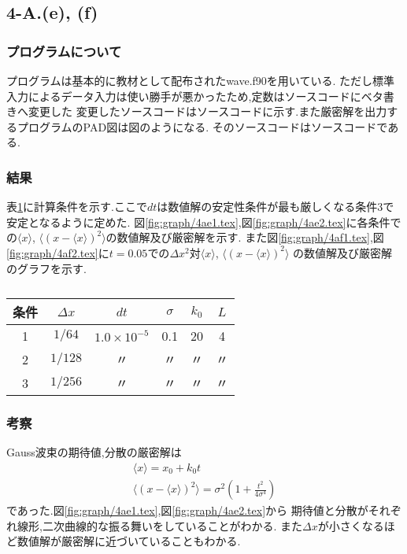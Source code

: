 \subsection*{4-A.(e), (f)}
\subsubsection*{プログラムについて}
プログラムは基本的に教材として配布されたwave.f90を用いている.
ただし標準入力によるデータ入力は使い勝手が悪かったため,定数はソースコードにベタ書きへ変更した
変更したソースコードはソースコードに示す.また厳密解を出力するプログラムのPAD図は図のようになる.
そのソースコードはソースコードである.
\subsubsection*{結果}
表\ref{tab:4aef_cond}に計算条件を示す.ここで$dt$は数値解の安定性条件が最も厳しくなる条件3で安定となるように定めた.
図\ref{fig:graph/4ae1.tex},図\ref{fig:graph/4ae2.tex}に各条件での$\langle x\rangle$, $\langle (x-\langle x\rangle)^2\rangle$の数値解及び厳密解を示す.
また図\ref{fig:graph/4af1.tex},図\ref{fig:graph/4af2.tex}に$t=0.05$での$\Delta x^2$対$\langle x\rangle$, $\langle (x-\langle x\rangle)^2\rangle$
の数値解及び厳密解のグラフを示す.
\begin{table}[h]
\caption{}
\label{tab:4aef_cond}
\centering
\begin{tabular}{cccccc}
\hline
条件&$\Delta x$&$dt$&$\sigma$&$k_0$&$L$\\
\hline \hline
1&$1/64 $&$1.0\times 10^{-5}$&0.1&20&4\\
2&$1/128$&〃&〃&〃&〃\\
3&$1/256$&〃&〃&〃&〃\\
\hline
\end{tabular}
\end{table}
\newpage
\subsubsection*{考察}
Gauss波束の期待値,分散の厳密解は
\begin{align}
  \langle x\rangle=x_0+k_0t\\
  \langle (x-\langle x\rangle)^2\rangle=\sigma^2\left(1+\frac{t^2}{4\sigma^4}\right)
\end{align}
であった.図\ref{fig:graph/4ae1.tex},図\ref{fig:graph/4ae2.tex}から
期待値と分散がそれぞれ線形,二次曲線的な振る舞いをしていることがわかる.
また$\Delta x$が小さくなるほど数値解が厳密解に近づいていることもわかる.

